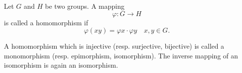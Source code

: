 Let $G$ and $H$ be two groups. A mapping
$$\varphi: G \to H$$
is called a homomorphism if
$$\varphi(xy) = \varphi x \cdot \varphi y \quad x, y \in G.$$

A homomorphism which is injective (resp. surjective, bijective) is called a monomorphism (resp. epimorphism, isomorphism). The inverse mapping of an isomorphism is again an isomorphism.
